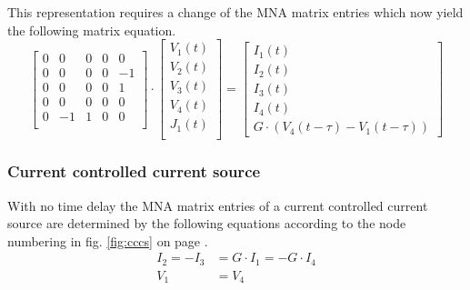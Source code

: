 This representation requires a change of the MNA matrix entries which
now yield the following matrix equation.
\begin{equation}
\begin{bmatrix}
0 & 0 & 0 & 0 & 0\\
0 & 0 & 0 & 0 & -1\\
0 & 0 & 0 & 0 & 1\\
0 & 0 & 0 & 0 & 0\\
0 & -1 & 1 & 0 & 0\\
\end{bmatrix}
\cdot
\begin{bmatrix}
V_1\left(t\right)\\
V_2\left(t\right)\\
V_3\left(t\right)\\
V_4\left(t\right)\\
J_1\left(t\right)\\
\end{bmatrix}
=
\begin{bmatrix}
I_1\left(t\right)\\
I_2\left(t\right)\\
I_3\left(t\right)\\
I_4\left(t\right)\\
G\cdot\left(V_4\left(t - \tau\right) - V_1\left(t - \tau\right)\right)
\end{bmatrix}
\end{equation}

\subsubsection{Current controlled current source}

With no time delay the MNA matrix entries of a current controlled
current source are determined by the following equations according to
the node numbering in fig. \ref{fig:cccs} on page \pageref{fig:cccs}.
\begin{align}
\label{eq:cccs_dc}
I_2 = -I_3 &= G\cdot I_1 = -G\cdot I_4\\
V_1 &= V_4
\end{align}

